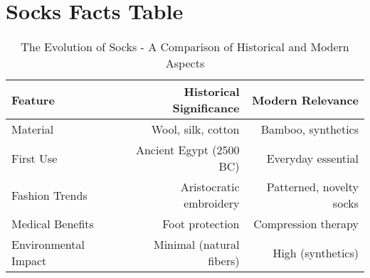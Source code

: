 \documentclass[runningheads]{llncs}
\begin{document}
\section{Socks Facts Table}\label{sec:Socks_Facts_Table}



\begin{table}
\centering
\caption{The Evolution of Socks - A Comparison of Historical and Modern Aspects}
\begin{tabular}{lrr}
\toprule
Feature & Historical Significance & Modern Relevance \\
\midrule
Material & Wool, silk, cotton & Bamboo, synthetics \\
First Use & Ancient Egypt (2500 BC) & Everyday essential \\
Fashion Trends & Aristocratic embroidery & Patterned, novelty socks \\
Medical Benefits & Foot protection & Compression therapy \\
Environmental Impact & Minimal (natural fibers) & High (synthetics) \\
\bottomrule
\end{tabular}
\end{table}



                         
\end{document}
